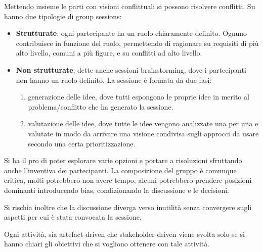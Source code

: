 \begin{itemize}
\begin{enumerate}
        Mettendo insieme le parti con visioni conflittuali si possono risolvere conflitti. Su hanno due tipologie di group sessions:
        \begin{itemize}
            \item \textbf{Strutturate}: ogni partecipante ha un ruolo chiaramente definito. Ognuno contribuisce in funzione del ruolo, permettendo di ragionare su requisiti di più alto livello, comuni a più figure, e su conflitti ad alto livello.
            \item \textbf{Non strutturate}, dette anche sessioni brainstorming, dove i partecipanti non hanno un ruolo definito. La sessione è formata da due fasi:
            \begin{enumerate}
                \item generazione delle idee, dove tutti espongono le proprie idee in merito al problema/conflitto che ha generato la sessione.
                \item valutazione delle idee, dove tutte le idee vengono analizzate una per una e valutate in modo da arrivare una visione condivisa sugli approcci da usare secondo una certa prioritizzazione.
            \end{enumerate}
        \end{itemize}
        
        Si ha il pro di poter esplorare varie opzioni e portare a risoluzioni sfruttando anche l'inventiva dei partecipanti. La composizione del gruppo è comunque critica, molti potrebbero non avere tempo, alcuni potrebbero prendere posizioni dominanti introducendo bias, condizionando la discussione e le decisioni.
        
        Si rischia inoltre che la discussione diverga verso inutilità senza convergere sugli aspetti per cui è stata convocata la sessione.
    \end{enumerate}
\end{itemize}
Ogni attività, sia artefact-driven che stakeholder-driven viene svolta solo se si hanno chiari gli obiettivi che si vogliono ottenere con tale attività.
